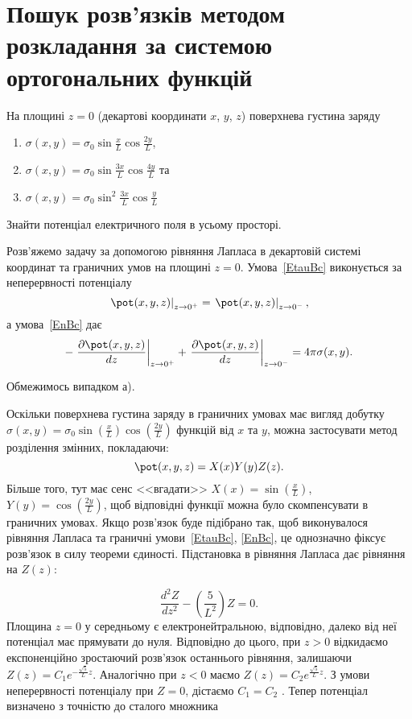 \section{Пошук розв'язків методом розкладання за системою ортогональних функцій}
\begin{problem}\label{prb:charged_plates}
На площині $z=0$ (декартові координати $x$, $y$, $z$) поверхнева густина заряду
\begin{enumerate}[label=\alph*)]
	\item $\sigma(x, y) = \sigma_0 \sin\frac{x}{L}\cos\frac{2y}{L}$,
	\item  $\sigma(x, y) = \sigma_0 \sin\frac{3x}{L}\cos\frac{4y}{L}$ та
	\item  $\sigma(x, y) = \sigma_0 \sin^2\frac{3x}{L}\cos\frac{y}{L}$
\end{enumerate}
Знайти потенціал електричного поля в усьому просторі.
\begin{solution}
    Розв'яжемо задачу за допомогою рівняння Лапласа в декартовій системі координат  та граничних умов на площині $z = 0$. Умова~\eqref{EtauBc} виконується за неперервності потенціалу
	\begin{equation*}\label{continuity}
		\left.\pot(x,y,z)\right|_{z \to 0^+} = \left.\pot(x,y,z)\right|_{z \to 0^-},
	\end{equation*}
	а умова~\eqref{EnBc} дає
	\begin{equation*}\label{boundary}
		-\left. \frac{\partial \pot(x,y,z)}{dz}\right|_{z \to 0^+} + \left. \frac{\partial \pot(x,y,z)}{dz}\right|_{z \to 0^-} =4\pi\sigma(x,y).
	\end{equation*}

	Обмежимось випадком а).

	Оскільки поверхнева густина заряду в граничних умовах має вигляд добутку $\sigma(x, y) = \sigma_0 \sin\left( \frac{x}{L}\right) \cos\left( \frac{2y}{L}\right) $ функцій від $x$ та $y$, можна застосувати метод розділення змінних, покладаючи:
    \[
        \pot(x,y,z) = X(x)Y(y)Z(z).
    \]
Більше того, тут має сенс <<вгадати>> $X(x) = \sin\left(\frac{x}{L}\right) $, $Y(y) = \cos\left(\frac{2y}{L}\right) $, щоб відповідні функції можна було скомпенсувати в граничних умовах. Якщо розв’язок буде підібрано так, щоб виконувалося рівняння Лапласа та граничні умови~\eqref{EtauBc}, \eqref{EnBc}, це однозначно фіксує розв'язок в силу теореми єдиності. Підстановка в рівняння Лапласа дає рівняння на $Z(z)$:

\begin{equation*}
    \frac{d^2Z}{dz^2} - \left( \frac{5}{L^2}\right) Z = 0.
\end{equation*}
Площина  $z = 0$ у середньому є електронейтральною, відповідно, далеко від неї потенціал має прямувати до нуля. Відповідно до цього, при $z >0$  відкидаємо експоненційно зростаючий розв’язок останнього рівняння, залишаючи $ Z(z) = C_1  e^{-\frac{\sqrt5}{L}z} $. Аналогічно при $z < 0$  маємо $ Z(z) = C_2  e^{\frac{\sqrt5}{L}z} $. З умови неперервності потенціалу при $Z = 0$, дістаємо $C_1 = C_2$ . Тепер потенціал визначено з точністю до сталого множника



\end{solution}
\end{problem}
